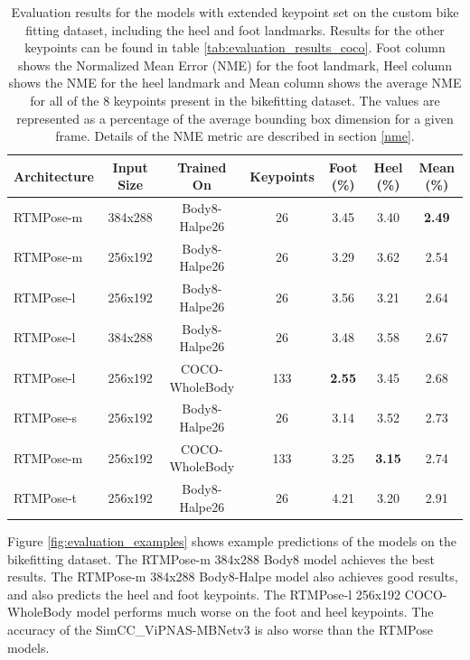 \begin{table}[htb]
    \setlength{\tabcolsep}{4pt}
    \centering
    \begin{tabular}{l cccccc}
        \toprule
        Architecture & Input Size & Trained On     & Keypoints & Foot (\%)     & Heel (\%)     & Mean (\%)     \\
        \midrule
        RTMPose-m    & 384x288    & Body8-Halpe26  & 26        & 3.45          & 3.40          & \textbf{2.49} \\
        RTMPose-m    & 256x192    & Body8-Halpe26  & 26        & 3.29          & 3.62          & 2.54          \\
        RTMPose-l    & 256x192    & Body8-Halpe26  & 26        & 3.56          & 3.21          & 2.64          \\
        RTMPose-l    & 384x288    & Body8-Halpe26  & 26        & 3.48          & 3.58          & 2.67          \\
        RTMPose-l    & 256x192    & COCO-WholeBody & 133       & \textbf{2.55} & 3.45          & 2.68          \\
        RTMPose-s    & 256x192    & Body8-Halpe26  & 26        & 3.14          & 3.52          & 2.73          \\
        RTMPose-m    & 256x192    & COCO-WholeBody & 133       & 3.25          & \textbf{3.15} & 2.74          \\
        RTMPose-t    & 256x192    & Body8-Halpe26  & 26        & 4.21          & 3.20          & 2.91          \\
        \bottomrule
    \end{tabular}
    \caption{Evaluation results for the models with extended keypoint set on the custom bike fitting dataset, including the heel and foot landmarks. Results for the other keypoints can be found in table \ref{tab:evaluation_results_coco}. Foot column shows the Normalized Mean Error (NME) for the foot landmark, Heel column shows the NME for the heel landmark and Mean column shows the average NME for all of the 8 keypoints present in the bikefitting dataset. The values are represented as a percentage of the average bounding box dimension for a given frame. Details of the NME metric are described in section \ref{nme}.}
    \label{tab:evaluation_results_wholebody}

\end{table}

Figure \ref{fig:evaluation_examples} shows example predictions of the models on the bikefitting dataset. The RTMPose-m 384x288 Body8 model achieves the best results. The RTMPose-m 384x288 Body8-Halpe model also achieves good results, and also predicts the heel and foot keypoints. The RTMPose-l 256x192 COCO-WholeBody model performs much worse on the foot and heel keypoints. The accuracy of the SimCC\_ViPNAS-MBNetv3 is also worse than the RTMPose models.

